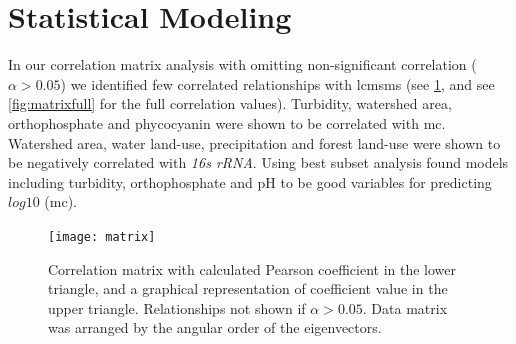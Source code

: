 \section{Statistical Modeling}

In our correlation matrix analysis with omitting non-significant correlation ($\alpha>0.05$) we identified few correlated relationships with \gls{lcmsms} (see \ref{matrix}, and see \ref{fig:matrixfull} for the full correlation values). Turbidity, watershed area, orthophosphate and phycocyanin were shown to be correlated with \gls{mc}. Watershed area, water land-use, precipitation and forest land-use were shown to be negatively correlated with \emph{16s rRNA}. Using best subset analysis found models including turbidity, orthophosphate and pH to be good variables for predicting  $log10$ (\gls{mc}).  


\begin{figure}
	\texttt{[image: matrix]}
	\vspace*{-15mm}
	\caption{
  Correlation matrix with calculated Pearson coefficient in the lower triangle, and a graphical representation of coefficient value in the upper triangle. Relationships not shown if $\alpha>0.05$. Data matrix was arranged by the angular order of the eigenvectors.}
	\label{matrix}
\end{figure}




